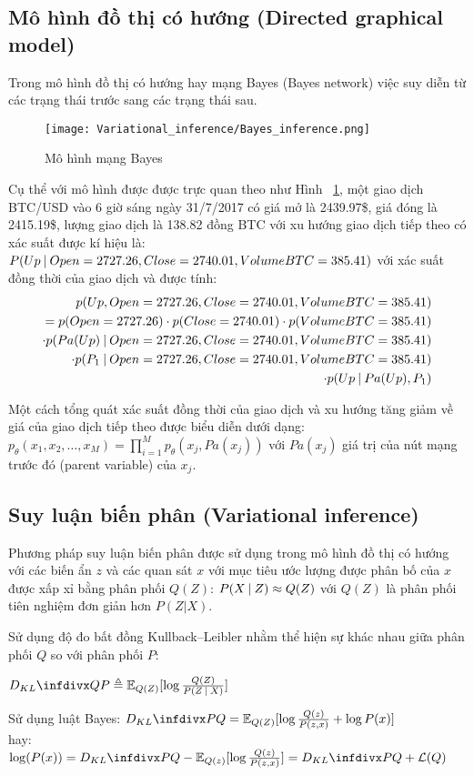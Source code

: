 \subsection{Mô hình đồ thị có hướng (Directed graphical model)}
Trong mô hình đồ thị có hướng hay mạng Bayes (Bayes network) việc suy diễn từ các trạng thái trước sang các trạng thái sau.
\begin{figure}[hbt!]
	\center	\texttt{[image: Variational\_inference/Bayes\_inference.png]}
	\caption{Mô hình mạng Bayes}
	\label{fig:Bayes_inference}
\end{figure}
Cụ thể với mô hình được được trực quan theo như Hình ~\ref{fig:Bayes_inference}, một giao dịch BTC/USD vào 6 giờ sáng ngày 31/7/2017 có giá mở là 2439.97\$, giá đóng là 2415.19\$, lượng giao dịch là 138.82 đồng BTC với xu hướng giao dịch tiếp theo có xác suất được kí hiệu là:
$P(Up \:\lvert\: Open =2727.26, Close=2740.01, Volume BTC = 385.41)$ với xác suất đồng thời của giao dịch và được tính:
\begin{equation}
\begin{split}
p(Up,Open = 2727.26, Close = 2740.01, Volume BTC = 385.41)\\
= p(Open = 2727.26) \cdot p(Close = 2740.01) \cdot p(Volume BTC = 385.41)\\
\cdot p(Pa(Up) \:\lvert\: Open =2727.26, Close=2740.01, Volume BTC = 385.41)\\
\cdot p(P_1 \:\lvert\: Open =2727.26, Close=2740.01, Volume BTC = 385.41)\\
\cdot p(Up \:\lvert\: Pa(Up), P_1)
\end{split}
\end{equation}



Một cách tổng quát xác suất đồng thời của giao dịch và xu hướng tăng giảm về giá của giao dịch tiếp theo được biểu diễn dưới dạng:
$p_\theta(x_1, x_2, \dots, x_M) = \prod_{i=1}^{M}p_\theta(x_j, Pa(x_j))$ với $Pa(x_j)$ giá trị của nút mạng trước đó (parent variable) của $x_j$.
\subsection{Suy luận biến phân (Variational inference)}
Phương pháp suy luận biến phân được sử dụng trong mô hình đồ thị có hướng\cite{intro_variational} với các biến ẩn $z$ và các quan sát $x$ với mục tiêu ước lượng được phân bố của $x$ được xấp xỉ bằng phân phối $Q(Z)$: $P(X \:\lvert\: Z) \approx Q(Z)$ với $Q(Z)$ là phân phối tiên nghiệm đơn giản hơn $P(Z|X)$.

Sử dụng độ đo bất đồng Kullback–Leibler nhằm thể hiện sự khác nhau giữa phân phối $Q$ so với phân phối $P$: 


$\Dkl{Q}{P} \triangleq  \mathbb{E}_{Q(Z)} [\log \frac{Q(Z)}{P(Z \given X)}]$

Sử dụng luật Bayes:
$\Dkl{P}{Q} = \mathbb{E}_{Q(Z)} [\log \frac{Q(z)}{P(z , x)}  + \log P(x)]$\\
hay:\\
$\log(P(x)) = \Dkl{P}{Q} - \mathbb{E}_{Q(z)} [\log \frac{Q(z)}{P(z , x)}]
= \Dkl{P}{Q} + \mathcal{L}(Q)
$
